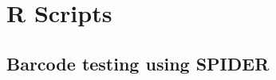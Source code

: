 




\section{R Scripts}
\label{appendix:rScripts}

\subsection{Barcode testing using SPIDER}
\label{appendix:RCODE,SPIDER}

